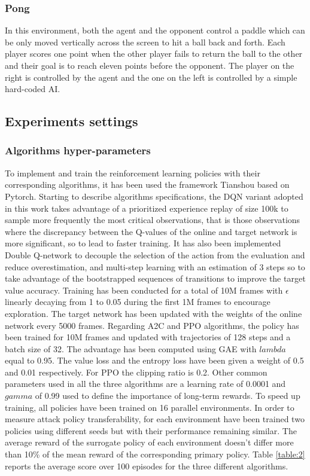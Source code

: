 \subsubsection{Pong}
In this environment, both the agent and the opponent control a paddle which can be only moved vertically across the screen to hit a ball back and forth. Each player scores one point when the other player fails to return the ball to the other and their goal is to reach eleven points before the opponent. The player on the right is controlled by the agent and the one on the left is controlled by a simple hard-coded AI.

\subsection{Experiments settings}
\subsubsection{Algorithms hyper-parameters}
To implement and train the reinforcement learning policies with their corresponding algorithms, it has been used the framework Tianshou \cite{tianshou} based on Pytorch. Starting to describe algorithms specifications, the DQN variant adopted in this work takes advantage of a prioritized experience replay \cite{schaul2016prioritized} of size 100k to sample more frequently the most critical observations, that is those observations where the discrepancy between the Q-values of the online and target network is more significant, so to lead to faster training. It has also been implemented Double Q-network to decouple the selection of the action from the evaluation and reduce overestimation, and multi-step learning with an estimation of 3 steps so to take advantage of the bootstrapped sequences of transitions to improve the target value accuracy. Training has been conducted for a total of 10M frames with \(\epsilon\) linearly decaying from 1 to 0.05 during the first 1M frames to encourage exploration. The target network has been updated with the weights of the online network every 5000 frames. Regarding A2C and PPO algorithms, the policy has been trained for 10M frames and updated with trajectories of 128 steps and a batch size of 32. The advantage has been computed using GAE with \(lambda\) equal to 0.95. The value loss and the entropy loss have been given a weight of 0.5 and 0.01 respectively. For PPO the clipping ratio is 0.2. Other common parameters used in all the three algorithms are a learning rate of 0.0001 and \(gamma\) of 0.99 used to define the importance of long-term rewards. To speed up training, all policies have been trained on 16 parallel environments. In order to measure attack policy transferability, for each environment have been trained two policies using different seeds but with their performance remaining similar. The average reward of the surrogate policy of each environment doesn't differ more than 10\% of the mean reward of the corresponding primary policy. Table \ref{table:2} reports the average score over 100 episodes for the three different algorithms.

